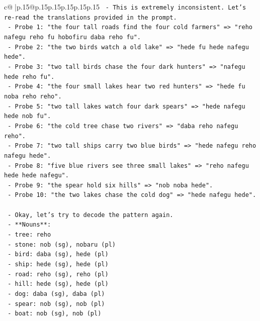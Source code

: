 \documentclass{article}
\begin{document}
{\begin{supertabular}{c@{$\;$}|p{.15\linewidth}@{}p{.15\linewidth}p{.15\linewidth}p{.15\linewidth}p{.15\linewidth}p{.15\linewidth}}
{{{\texttt{        {-} This is extremely inconsistent. Let's re{-}read the translations provided in the prompt.} \\
\texttt{        {-} Probe 1: "the four tall roads find the four cold farmers" => "reho nafegu reho fu hobofiru daba reho fu".} \\
\texttt{        {-} Probe 2: "the two birds watch a old lake" => "hede fu hede nafegu hede".} \\
\texttt{        {-} Probe 3: "two tall birds chase the four dark hunters" => "nafegu hede reho fu".} \\
\texttt{        {-} Probe 4: "the four small lakes hear two red hunters" => "hede fu noba reho reho".} \\
\texttt{        {-} Probe 5: "two tall lakes watch four dark spears" => "hede nafegu hede nob fu".} \\
\texttt{        {-} Probe 6: "the cold tree chase two rivers" => "daba reho nafegu reho".} \\
\texttt{        {-} Probe 7: "two tall ships carry two blue birds" => "hede nafegu reho nafegu hede".} \\
\texttt{        {-} Probe 8: "five blue rivers see three small lakes" => "reho nafegu hede hede nafegu".} \\
\texttt{        {-} Probe 9: "the spear hold six hills" => "nob noba hede".} \\
\texttt{        {-} Probe 10: "the two lakes chase the cold dog" => "hede nafegu hede".} \\
\\ 
\texttt{        {-} Okay, let's try to decode the pattern again.} \\
\texttt{        {-} **Nouns**:} \\
\texttt{            {-} tree: reho} \\
\texttt{            {-} stone: nob (sg), nobaru (pl)} \\
\texttt{            {-} bird: daba (sg), hede (pl)} \\
\texttt{            {-} ship: hede (sg), hede (pl)} \\
\texttt{            {-} road: reho (sg), reho (pl)} \\
\texttt{            {-} hill: hede (sg), hede (pl)} \\
\texttt{            {-} dog: daba (sg), daba (pl)} \\
\texttt{            {-} spear: nob (sg), nob (pl)} \\
\texttt{            {-} boat: nob (sg), nob (pl)} \\
}}}
\end{supertabular}}
\end{document}
